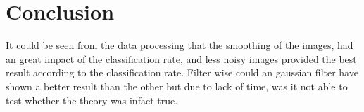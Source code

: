 \chapter{Conclusion}
It could be seen from the data processing that the smoothing of the images, had an great impact of the classification rate, and  less noisy images provided the best result according to the classification rate.   Filter wise could an gaussian filter have shown a better result than the other but due to lack of time, was it not able to test whether the theory was infact true. 